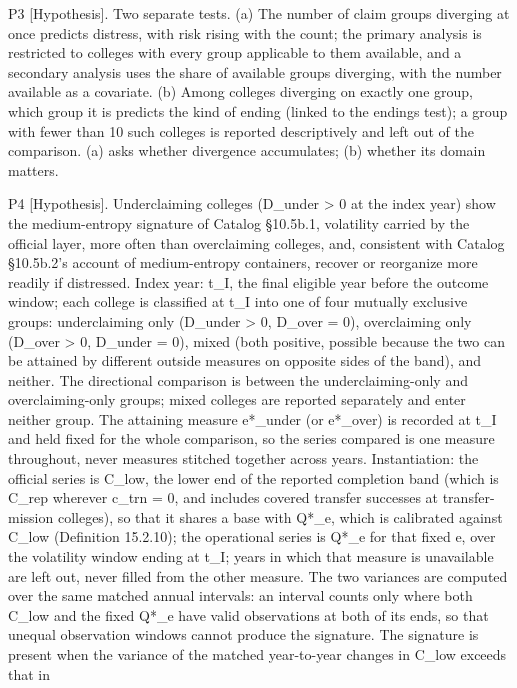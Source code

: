 \documentclass[
]{article}
\begin{document}
P3 {[}Hypothesis{]}. Two separate tests. (a) The number of claim groups
diverging at once predicts distress, with risk rising with the count;
the primary analysis is restricted to colleges with every group
applicable to them available, and a secondary analysis uses the share of
available groups diverging, with the number available as a covariate.
(b) Among colleges diverging on exactly one group, which group it is
predicts the kind of ending (linked to the endings test); a group with
fewer than 10 such colleges is reported descriptively and left out of
the comparison. (a) asks whether divergence accumulates; (b) whether its
domain matters.

P4 {[}Hypothesis{]}. Underclaiming colleges (D\_under \textgreater{} 0
at the index year) show the medium-entropy signature of Catalog
§10.5b.1, volatility carried by the official layer, more often than
overclaiming colleges, and, consistent with Catalog §10.5b.2's account
of medium-entropy containers, recover or reorganize more readily if
distressed. Index year: t\_I, the final eligible year before the outcome
window; each college is classified at t\_I into one of four mutually
exclusive groups: underclaiming only (D\_under \textgreater{} 0, D\_over
= 0), overclaiming only (D\_over \textgreater{} 0, D\_under = 0), mixed
(both positive, possible because the two can be attained by different
outside measures on opposite sides of the band), and neither. The
directional comparison is between the underclaiming-only and
overclaiming-only groups; mixed colleges are reported separately and
enter neither group. The attaining measure e*\_under (or e*\_over) is
recorded at t\_I and held fixed for the whole comparison, so the series
compared is one measure throughout, never measures stitched together
across years. Instantiation: the official series is C\_low, the lower
end of the reported completion band (which is C\_rep wherever c\_trn =
0, and includes covered transfer successes at transfer-mission
colleges), so that it shares a base with Q*\_e, which is calibrated
against C\_low (Definition 15.2.10); the operational series is Q*\_e for
that fixed e, over the volatility window ending at t\_I; years in which
that measure is unavailable are left out, never filled from the other
measure. The two variances are computed over the same matched annual
intervals: an interval counts only where both C\_low and the fixed Q*\_e
have valid observations at both of its ends, so that unequal observation
windows cannot produce the signature. The signature is present when the
variance of the matched year-to-year changes in C\_low exceeds that in
\end{document}
